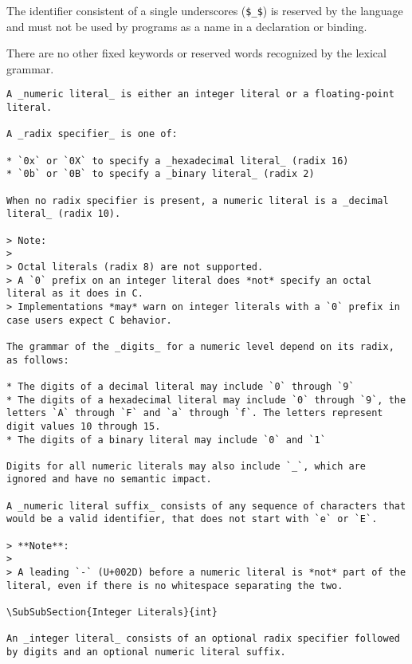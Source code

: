 The identifier consistent of a single underscores (\lstinline|$_$|) is reserved by the language and must not be used by programs as a name in a declaration or binding.

\begin{Note}
There are no other fixed keywords or reserved words recognized by the lexical grammar.
\end{Note}



\begin{verbatim}
A _numeric literal_ is either an integer literal or a floating-point literal.

A _radix specifier_ is one of:

* `0x` or `0X` to specify a _hexadecimal literal_ (radix 16)
* `0b` or `0B` to specify a _binary literal_ (radix 2)

When no radix specifier is present, a numeric literal is a _decimal literal_ (radix 10).

> Note:
>
> Octal literals (radix 8) are not supported.
> A `0` prefix on an integer literal does *not* specify an octal literal as it does in C.
> Implementations *may* warn on integer literals with a `0` prefix in case users expect C behavior.

The grammar of the _digits_ for a numeric level depend on its radix, as follows:

* The digits of a decimal literal may include `0` through `9`
* The digits of a hexadecimal literal may include `0` through `9`, the letters `A` through `F` and `a` through `f`. The letters represent digit values 10 through 15.
* The digits of a binary literal may include `0` and `1`

Digits for all numeric literals may also include `_`, which are ignored and have no semantic impact.

A _numeric literal suffix_ consists of any sequence of characters that would be a valid identifier, that does not start with `e` or `E`.

> **Note**:
>
> A leading `-` (U+002D) before a numeric literal is *not* part of the literal, even if there is no whitespace separating the two.

\SubSubSection{Integer Literals}{int}

An _integer literal_ consists of an optional radix specifier followed by digits and an optional numeric literal suffix.


\end{verbatim}
